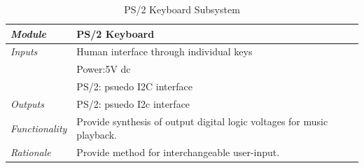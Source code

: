 \documentclass[bibtotocnumbered,abstract=on,paper=a4,fontsize=12pt,parskip=on,halfparskip=on]{scrartcl}		%
\begin{document}
      \begin{table}[H]
      \caption{PS/2 Keyboard Subsystem}
      \vskip 0.3cm 
      \begin{tabularx}{\linewidth}{  l X }
        \textit{Module} & PS/2 Keyboard \\
        \hline
        \textit{Inputs} & Human interface through individual keys\\
           & Power:5V dc\\
           & PS/2: psuedo I2C interface\\
        \hline
        \textit{Outputs} & PS/2: psuedo I2c interface \\
        \hline
        \textit{Functionality} & Provide synthesis of output digital logic voltages for music playback.\\
        \hline
        \textit{Rationale} & Provide method for interchangeable user-input.\\
      \end{tabularx}
      \end{table}
\end{document}
